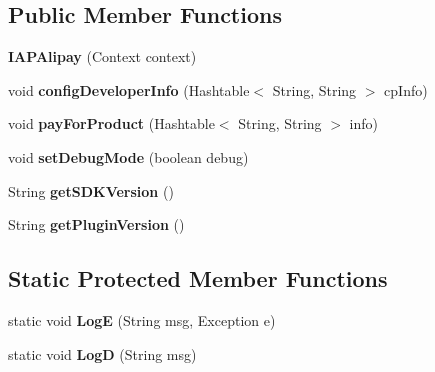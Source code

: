 \subsection*{Public Member Functions}
\begin{DoxyCompactItemize}
\item 
\mbox{\label{classorg_1_1cocos2dx_1_1plugin_1_1IAPAlipay_a0011d514c9a2f0e39ae9488cc68ef32f}} 
{\bfseries I\+A\+P\+Alipay} (Context context)
\item 
\mbox{\label{classorg_1_1cocos2dx_1_1plugin_1_1IAPAlipay_a50ab9d7061464c39e0fc7d6538cd8c9c}} 
void {\bfseries config\+Developer\+Info} (Hashtable$<$ String, String $>$ cp\+Info)
\item 
\mbox{\label{classorg_1_1cocos2dx_1_1plugin_1_1IAPAlipay_a5596cdbffd35def688f941dec328d695}} 
void {\bfseries pay\+For\+Product} (Hashtable$<$ String, String $>$ info)
\item 
\mbox{\label{classorg_1_1cocos2dx_1_1plugin_1_1IAPAlipay_a0d96ce70cba399cae9b7deb074080426}} 
void {\bfseries set\+Debug\+Mode} (boolean debug)
\item 
\mbox{\label{classorg_1_1cocos2dx_1_1plugin_1_1IAPAlipay_a153838eeabea27e1cb1a9bf93452ba2f}} 
String {\bfseries get\+S\+D\+K\+Version} ()
\item 
\mbox{\label{classorg_1_1cocos2dx_1_1plugin_1_1IAPAlipay_a01927c1a48403fdc60839b3023a99ef0}} 
String {\bfseries get\+Plugin\+Version} ()
\end{DoxyCompactItemize}
\subsection*{Static Protected Member Functions}
\begin{DoxyCompactItemize}
\item 
\mbox{\label{classorg_1_1cocos2dx_1_1plugin_1_1IAPAlipay_a3f56f6aa70d6406693bbfbbed77e3c1c}} 
static void {\bfseries LogE} (String msg, Exception e)
\item 
\mbox{\label{classorg_1_1cocos2dx_1_1plugin_1_1IAPAlipay_aae9029c3488c989ea8a98588c8cc07ba}} 
static void {\bfseries LogD} (String msg)
\end{DoxyCompactItemize}
